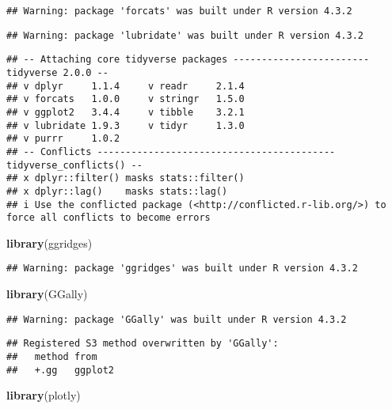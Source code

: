 \documentclass[
]{article}
\newenvironment{Shaded}{\begin{snugshade}}{\end{snugshade}}
\newcommand{\FunctionTok}[1]{\textcolor[rgb]{0.13,0.29,0.53}{\textbf{#1}}}
\newcommand{\NormalTok}[1]{#1}
\begin{document}
\begin{verbatim}
## Warning: package 'forcats' was built under R version 4.3.2
\end{verbatim}

\begin{verbatim}
## Warning: package 'lubridate' was built under R version 4.3.2
\end{verbatim}

\begin{verbatim}
## -- Attaching core tidyverse packages ------------------------ tidyverse 2.0.0 --
## v dplyr     1.1.4     v readr     2.1.4
## v forcats   1.0.0     v stringr   1.5.0
## v ggplot2   3.4.4     v tibble    3.2.1
## v lubridate 1.9.3     v tidyr     1.3.0
## v purrr     1.0.2     
## -- Conflicts ------------------------------------------ tidyverse_conflicts() --
## x dplyr::filter() masks stats::filter()
## x dplyr::lag()    masks stats::lag()
## i Use the conflicted package (<http://conflicted.r-lib.org/>) to force all conflicts to become errors
\end{verbatim}

\begin{Shaded}
\begin{Highlighting}[]
\FunctionTok{library}\NormalTok{(ggridges)}
\end{Highlighting}
\end{Shaded}

\begin{verbatim}
## Warning: package 'ggridges' was built under R version 4.3.2
\end{verbatim}

\begin{Shaded}
\begin{Highlighting}[]
\FunctionTok{library}\NormalTok{(GGally)}
\end{Highlighting}
\end{Shaded}

\begin{verbatim}
## Warning: package 'GGally' was built under R version 4.3.2
\end{verbatim}

\begin{verbatim}
## Registered S3 method overwritten by 'GGally':
##   method from   
##   +.gg   ggplot2
\end{verbatim}

\begin{Shaded}
\begin{Highlighting}[]
\FunctionTok{library}\NormalTok{(plotly)}
\end{Highlighting}
\end{Shaded}
\end{document}
